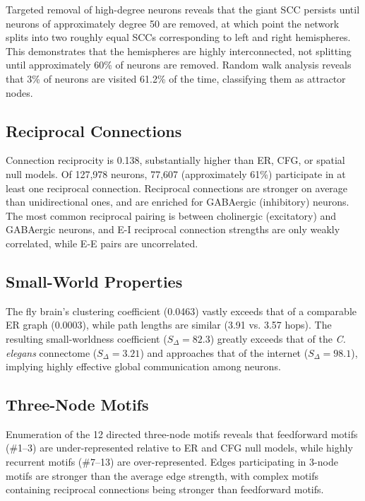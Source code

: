 \documentclass[11pt]{article}
\begin{document}
Targeted removal of high-degree neurons reveals that the giant SCC persists until neurons of approximately degree 50 are removed, at which point the network splits into two roughly equal SCCs corresponding to left and right hemispheres. This demonstrates that the hemispheres are highly interconnected, not splitting until approximately 60\% of neurons are removed. Random walk analysis reveals that 3\% of neurons are visited 61.2\% of the time, classifying them as attractor nodes.

\subsection{Reciprocal Connections}

Connection reciprocity is 0.138, substantially higher than ER, CFG, or spatial null models. Of 127,978 neurons, 77,607 (approximately 61\%) participate in at least one reciprocal connection. Reciprocal connections are stronger on average than unidirectional ones, and are enriched for GABAergic (inhibitory) neurons. The most common reciprocal pairing is between cholinergic (excitatory) and GABAergic neurons, and E-I reciprocal connection strengths are only weakly correlated, while E-E pairs are uncorrelated.

\subsection{Small-World Properties}

The fly brain's clustering coefficient (0.0463) vastly exceeds that of a comparable ER graph (0.0003), while path lengths are similar (3.91 vs. 3.57 hops). The resulting small-worldness coefficient ($S_\Delta = 82.3$) greatly exceeds that of the \textit{C. elegans} connectome ($S_\Delta = 3.21$) and approaches that of the internet ($S_\Delta = 98.1$), implying highly effective global communication among neurons.

\subsection{Three-Node Motifs}

Enumeration of the 12 directed three-node motifs reveals that feedforward motifs (\#1--3) are under-represented relative to ER and CFG null models, while highly recurrent motifs (\#7--13) are over-represented. Edges participating in 3-node motifs are stronger than the average edge strength, with complex motifs containing reciprocal connections being stronger than feedforward motifs.
\end{document}
